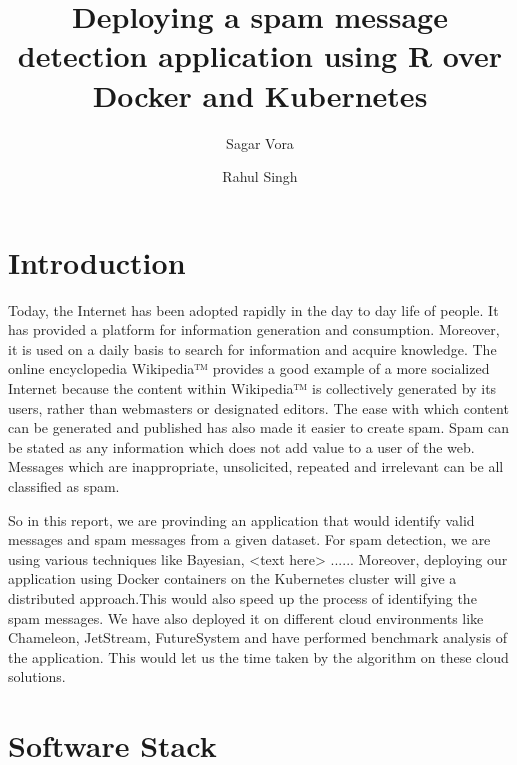 \documentclass[9pt,twocolumn,twoside]{../../styles/osajnl}
\title{Deploying a spam message detection application using R over Docker and Kubernetes}
\author[1,*]{Sagar Vora}
\author[1]{Rahul Singh}
\affil[1]{School of Informatics and Computing, Bloomington, IN 47408, U.S.A.}
\affil[*]{Corresponding authors: vorasagar7@gmail.com, rahul\textunderscore singh919@yahoo.com}
\begin{document}
\maketitle

\section{Introduction}

Today, the Internet \cite{www-internet} has been adopted rapidly in
the day to day life of people. It has provided a platform for
information generation and consumption. Moreover, it is used on a
daily basis to search for information and acquire knowledge. The
online encyclopedia Wikipedia™ \cite{www-wikipedia} provides a good
example of a more socialized Internet because the content within
Wikipedia™ is collectively generated by its users, rather than
webmasters or designated editors. The ease with which content can be
generated and published has also made it easier to create spam. Spam
can be stated as any information which does not add value to a user of
the web. Messages which are inappropriate, unsolicited, repeated and
irrelevant can be all classified as spam.

\noindent
So in this report, we are provinding an application that would
identify valid messages and spam messages from a given dataset. For
spam detection, we are using various techniques like Bayesian, <text
here> ...... Moreover, deploying our application using Docker
\cite{www-docker-about} containers on the Kubernetes
\cite{www-kubernetes} cluster will give a distributed approach.This
would also speed up the process of identifying the spam messages. We
have also deployed it on different cloud environments like Chameleon,
JetStream, FutureSystem and have performed benchmark analysis of the
application. This would let us the time taken by the algorithm on
these cloud solutions.

\section{Software Stack}
\end{document}
